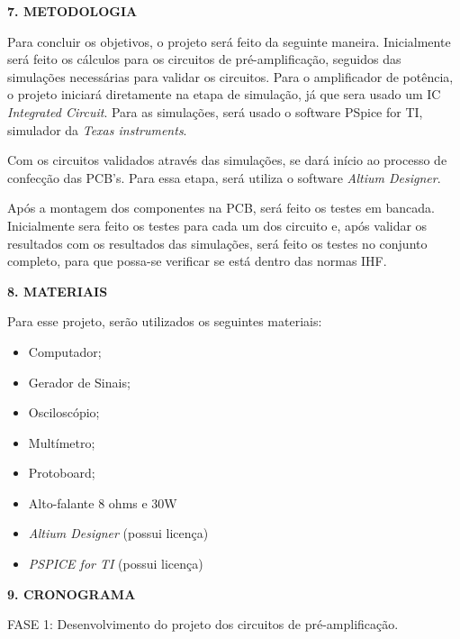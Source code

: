 \documentclass{article}
\begin{document}
\vspace{0.4cm}

\textbf{7. METODOLOGIA}

Para concluir os objetivos, o projeto será feito da seguinte maneira. %
Inicialmente será feito os cálculos para os circuitos de pré-amplificação, seguidos das simulações necessárias para validar os circuitos. Para o amplificador de potência,
o projeto iniciará diretamente na etapa de simulação, já que sera usado um IC \textit{Integrated Circuit}. Para as simulações, será usado o software PSpice for TI, simulador
da \textit{Texas instruments}.

Com os circuitos validados através das simulações, se dará início ao processo de confecção das PCB's. Para essa etapa, será utiliza o software \textit{Altium Designer}.

Após a montagem dos componentes na PCB, será feito os testes em bancada. Inicialmente sera feito os testes para cada um dos circuito e, após validar os resultados com os resultados das simulações,
será feito os testes no conjunto completo, para que possa-se verificar se está dentro das normas IHF. %

\vspace{0.4cm}

\textbf{8. MATERIAIS}

Para esse projeto, serão utilizados os seguintes materiais:

\begin{itemize}
    \item Computador;
    \item Gerador de Sinais;
    \item Osciloscópio;
    \item Multímetro;
    \item Protoboard;
    \item Alto-falante 8 ohms e 30W
    \item \textit{Altium Designer} (possui licença)
    \item \textit{PSPICE for TI} (possui licença)
\end{itemize}

\vspace{0.4cm}

\textbf{9. CRONOGRAMA}

FASE 1: Desenvolvimento do projeto dos circuitos de pré-amplificação.
\end{document}
